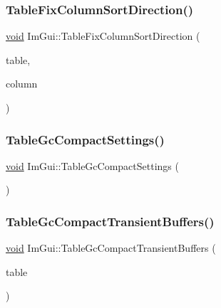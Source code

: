 \mbox{\label{namespaceImGui_a6eb757220d4d7276577cfadfd056c9fe}} 
\subsubsection{\texorpdfstring{Table\+Fix\+Column\+Sort\+Direction()}{TableFixColumnSortDirection()}}
{\footnotesize\ttfamily \hyperlink{imgui__impl__opengl3__loader_8h_ac668e7cffd9e2e9cfee428b9b2f34fa7}{void} Im\+Gui\+::\+Table\+Fix\+Column\+Sort\+Direction (\begin{DoxyParamCaption}\item[{\hyperlink{structImGuiTable}{Im\+Gui\+Table} $\ast$}]{table,  }\item[{\hyperlink{structImGuiTableColumn}{Im\+Gui\+Table\+Column} $\ast$}]{column }\end{DoxyParamCaption})}

\mbox{\label{namespaceImGui_a4e0c06857053c7c3fbde16b8fd5bee17}} 
\subsubsection{\texorpdfstring{Table\+Gc\+Compact\+Settings()}{TableGcCompactSettings()}}
{\footnotesize\ttfamily \hyperlink{imgui__impl__opengl3__loader_8h_ac668e7cffd9e2e9cfee428b9b2f34fa7}{void} Im\+Gui\+::\+Table\+Gc\+Compact\+Settings (\begin{DoxyParamCaption}{ }\end{DoxyParamCaption})}

\mbox{\label{namespaceImGui_af3cb65f8b45057e34fa7d9447a57eb28}} 
\subsubsection{\texorpdfstring{Table\+Gc\+Compact\+Transient\+Buffers()}{TableGcCompactTransientBuffers()}\hspace{0.1cm}{\footnotesize\ttfamily [1/2]}}
{\footnotesize\ttfamily \hyperlink{imgui__impl__opengl3__loader_8h_ac668e7cffd9e2e9cfee428b9b2f34fa7}{void} Im\+Gui\+::\+Table\+Gc\+Compact\+Transient\+Buffers (\begin{DoxyParamCaption}\item[{\hyperlink{structImGuiTable}{Im\+Gui\+Table} $\ast$}]{table }\end{DoxyParamCaption})}

